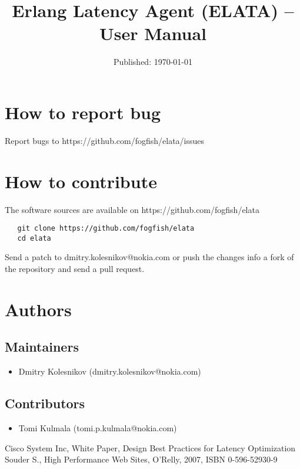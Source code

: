 \documentclass[10pt]{article}
\begin{document}
\title{Erlang Latency Agent (ELATA) -- User Manual}
\date{Published: \today}

\maketitle





\section{How to report bug}

Report bugs to https://github.com/fogfish/elata/issues

\section{How to contribute}

The software sources are available on https://github.com/fogfish/elata
\begin{verbatim}
   git clone https://github.com/fogfish/elata
   cd elata
\end{verbatim}

Send a patch to dmitry.kolesnikov@nokia.com or push the changes info a fork of the repository and send a pull request.

\section{Authors}

\subsection{Maintainers}
\begin{itemize} 
\item Dmitry Kolesnikov (dmitry.kolesnikov@nokia.com)
\end{itemize}

\subsection{Contributors}
\begin{itemize}
\item Tomi Kulmala (tomi.p.kulmala@nokia.com)
\end{itemize}



\begin{thebibliography}{}
%
%
Cisco System Inc, White Paper, Design Best Practices for Latency Optimization
Souder S., High Performance Web Sites, O'Relly, 2007, ISBN 0-596-52930-9
\end{thebibliography}
\end{document}

